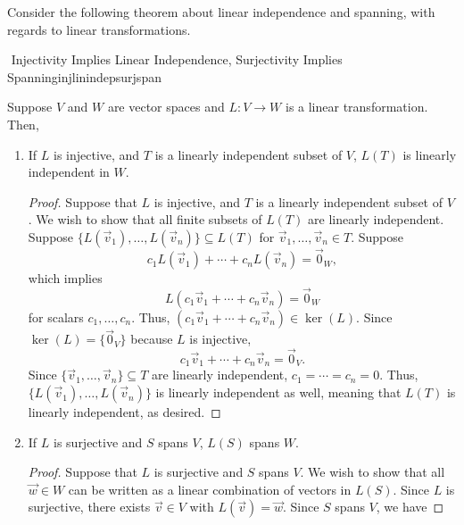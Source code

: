         Consider the following theorem about linear independence and spanning, with regards to linear transformations.
        \begin{theorem}{\Stop\,\,Injectivity Implies Linear Independence, Surjectivity Implies Spanning}{injlinindepsurjspan}

            Suppose \(V\) and \(W\) are vector spaces and \(L:V\to W\) is a linear transformation. Then,
            \begin{enumerate}
                \item If \(L\) is injective, and \(T\) is a linearly independent subset of \(V\), \(L(T)\) is linearly independent in \(W\).
                \begin{proof}
                    Suppose that \(L\) is injective, and \(T\) is a linearly independent subset of \(V\). We wish to show that all finite subsets of \(L(T)\) are linearly independent. Suppose \(\{L(\vec{v}_1),\ldots,L(\vec{v}_n)\}\subseteq L(T)\) for \(\vec{v}_1,\ldots,\vec{v}_n\in T\). Suppose
                    \begin{equation*}
                        c_1L(\vec{v}_1)+\cdots+c_nL(\vec{v}_n)=\vec{0}_W,
                    \end{equation*}
                    which implies 
                    \begin{equation*}
                        L(c_1\vec{v}_1+\cdots+c_n\vec{v}_n)=\vec{0}_W
                    \end{equation*}
                    for scalars \(c_1,\ldots,c_n\). Thus, \((c_1\vec{v}_1+\cdots+c_n\vec{v}_n)\in\ker(L)\). Since \(\ker(L)=\{\vec{0}_V\}\) because \(L\) is injective,
                    \begin{equation*}
                        c_1\vec{v}_1+\cdots+c_n\vec{v}_n=\vec{0}_V.
                    \end{equation*}
                    Since \(\{\vec{v}_1,\ldots,\vec{v}_n\}\subseteq T\) are linearly independent, \(c_1=\cdots=c_n=0\). Thus, \(\{L(\vec{v}_1),\ldots,L(\vec{v}_n)\}\) is linearly independent as well, meaning that \(L(T)\) is linearly independent, as desired.
                \end{proof}
                \item If \(L\) is surjective and \(S\) spans \(V\), \(L(S)\) spans \(W\).
                \begin{proof}
                    Suppose that \(L\) is surjective and \(S\) spans \(V\). We wish to show that all \(\vec{w}\in W\) can be written as a linear combination of vectors in \(L(S)\). Since \(L\) is surjective, there exists \(\vec{v}\in V\) with \(L(\vec{v})=\vec{w}\). Since \(S\) spans \(V\), we have

\end{proof}
\end{enumerate}
\end{theorem}
